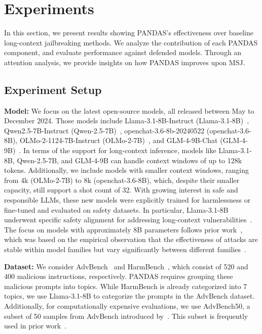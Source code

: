 \section{Experiments}\label{sec:exp}
In this section, we present results showing PANDAS's effectiveness over baseline long-context jailbreaking methods. We analyze the contribution of each PANDAS component, and evaluate performance against defended models. Through an attention analysis, we provide insights on how PANDAS improves upon MSJ.

\subsection{Experiment Setup}\label{sec:exp-setup}
\textbf{Model:} We focus on the latest open-source models, all released between May to December 2024.
% 
Those models include Llama-3.1-8B-Instruct (Llama-3.1-8B)~\citep{dubey2024llama},  %
Qwen2.5-7B-Instruct (Qwen-2.5-7B)~\citep{qwen2,qwen2.5}, %
openchat-3.6-8b-20240522 (openchat-3.6-8B), %
OLMo-2-1124-7B-Instruct (OLMo-2-7B)~\citep{olmo20242olmo2furious}, %
and GLM-4-9B-Chat (GLM-4-9B)~\citep{glm2024chatglm}. %
% 
In terms of the support for long-context inference, models like Llama-3.1-8B, Qwen-2.5-7B, and GLM-4-9B can handle context windows of up to 128k tokens. Additionally, we include models with smaller context windows, ranging from 4k (OLMo-2-7B) to 8k (openchat-3.6-8B), which, despite their smaller capacity, still support a shot count of 32.
% 
With growing interest in safe and responsible LLMs, these new models were explicitly trained for harmlessness or fine-tuned and evaluated on safety datasets. 
% 
In particular, Llama-3.1-8B underwent specific safety alignment for addressing long-context vulnerabilities~\citep{dubey2024llama}. The focus on models with approximately 8B parameters follows prior work~\citep{zheng2024improved}, which was based on the empirical observation that the effectiveness of attacks are stable within model families but vary significantly between different families~\citep{mazeika2024harmbench}.

\noindent\textbf{Dataset:} We consider AdvBench~\citep{zou2023universal} and HarmBench~\citep{mazeika2024harmbench}, which consist of 520 and 400 malicious instructions, respectively. PANDAS requires grouping these malicious prompts into topics. While HarmBench is already categorized into 7 topics, we use Llama-3.1-8B to categorize the prompts in the AdvBench dataset. Additionally, for computationally expensive evaluations, we use AdvBench50, a subset of 50 samples from AdvBench introduced by~\citet{chao2023jailbreaking}. This subset is frequently used in prior work~\citep{zheng2024improved,xiao2024distract,mehrotra2023tree,pu2024baitattack}. 

